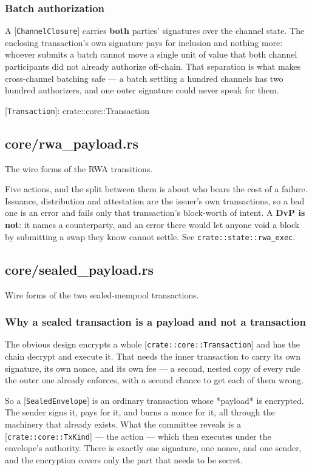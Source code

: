 \documentclass[11pt,a4paper]{article}
\begin{document}
\subsubsection{Batch authorization}

A [\texttt{ChannelClosure}] carries \textbf{both} parties' signatures over the channel
state. The enclosing transaction's own signature pays for inclusion and
nothing more: whoever submits a batch cannot move a single unit of value
that both channel participants did not already authorize off-chain. That
separation is what makes cross-channel batching safe — a batch settling a
hundred channels has two hundred authorizers, and one outer signature could
never speak for them.

[\texttt{Transaction}]: crate::core::Transaction

\subsection{core/rwa\_payload.rs}
The wire forms of the RWA transitions.

Five actions, and the split between them is about who bears the cost of a
failure. Issuance, distribution and attestation are the issuer's own
transactions, so a bad one is an error and fails only that transaction's
block-worth of intent. A \textbf{DvP is not}: it names a counterparty, and an
error there would let anyone void a block by submitting a swap they know
cannot settle. See \texttt{crate::state::rwa\_exec}.

\subsection{core/sealed\_payload.rs}
Wire forms of the two sealed-mempool transactions.

\subsubsection{Why a sealed transaction is a payload and not a transaction}

The obvious design encrypts a whole [\texttt{crate::core::Transaction}] and has the
chain decrypt and execute it. That needs the inner transaction to carry its
own signature, its own nonce, and its own fee — a second, nested copy of
every rule the outer one already enforces, with a second chance to get each
of them wrong.

So a [\texttt{SealedEnvelope}] is an ordinary transaction whose *payload* is
encrypted. The sender signs it, pays for it, and burns a nonce for it, all
through the machinery that already exists. What the committee reveals is a
[\texttt{crate::core::TxKind}] — the action — which then executes under the
envelope's authority. There is exactly one signature, one nonce, and one
sender, and the encryption covers only the part that needs to be secret.
\end{document}
